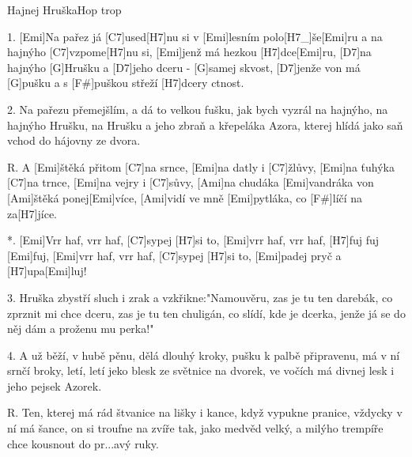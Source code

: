 \begin{song}{Hajnej Hruška}{Hop trop}

\begin{xverse}{1. }
[Emi]Na pařez já [C7]used[H7]nu si v [Emi]lesním polo[H7_]{še}[Emi]{ru}
a na hajnýho [C7]vzpome[H7]nu si, [Emi]jenž má hezkou [H7]dce[Emi]ru,
[D7]na hajnýho [G]Hrušku a [D7]jeho dceru - [G]samej skvost,
[D7]jenže von má [G]pušku a s [F#]puškou střeží [H7]dcery ctnost.
\end{xverse}

\begin{xverse}{2. }
Na pařezu přemejšlím, a dá to velkou fušku,
jak bych vyzrál na hajnýho, na hajnýho Hrušku,
na Hrušku a jeho zbraň a křepeláka Azora,
kterej hlídá jako saň vchod do hájovny ze dvora.
\end{xverse}

\begin{xverse}{R. }
A [Emi]{ště}ká přitom [C7]na srnce, [Emi]na datly i [C7]{žlů}vy,
[Emi]na ťuhýka [C7]na trnce, [Emi]na vejry i [C7]sůvy,
[Ami]na chudáka [Emi]vandráka von [Ami]{ště}ká ponej[Emi]více,
[Ami]vidí ve mně [Emi]pytláka, co [F#]líčí na za[H7]jíce.
\end{xverse}

\begin{xverse}{*. }
[Emi]Vrr haf, vrr haf, [C7]sypej [H7]si to, [Emi]vrr haf, vrr haf, [H7]fuj fuj [Emi]fuj,
[Emi]vrr haf, vrr haf, [C7]sypej [H7]si to, [Emi]padej pryč a [H7]upa[Emi]luj!
\end{xverse}

\begin{xverse}{3. }
Hruška zbystří sluch i zrak a vzkřikne:"Namouvěru,
zas je tu ten darebák, co zprznit mi chce dceru,
zas je tu ten chuligán, co slídí, kde je dcerka,
jenže já se do něj dám a proženu mu perka!"
\end{xverse}

\begin{xverse}{4. }
A už běží, v hubě pěnu, dělá dlouhý kroky,
pušku k palbě připravenu, má v ní srnčí broky,
letí, letí jeko blesk ze světnice na dvorek,
ve vočích má divnej lesk i jeho pejsek Azorek.
\end{xverse}

\begin{xverse}{R. }
Ten, kterej má rád štvanice na lišky i kance,
když vypukne pranice, vždycky v ní má šance,
on si troufne na zvíře tak, jako medvěd velký,
a milýho trempíře chce kousnout do pr...avý ruky.
\end{xverse}


\end{song}
